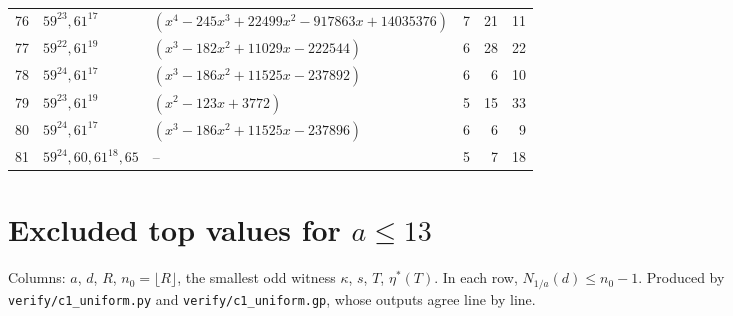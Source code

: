 \documentclass[11pt]{article}
\theoremstyle{definition}
\begin{document}
{\begin{longtable}{rlp{6.2cm}rrr}
76 & $59^{23}, 61^{17}$ & $(x^{4} - 245x^{3} + 22499x^{2} - 917863x + 14035376)$ & 7 & 21 & 11 \\
77 & $59^{22}, 61^{19}$ & $(x^{3} - 182x^{2} + 11029x - 222544)$ & 6 & 28 & 22 \\
78 & $59^{24}, 61^{17}$ & $(x^{3} - 186x^{2} + 11525x - 237892)$ & 6 & 6 & 10 \\
79 & $59^{23}, 61^{19}$ & $(x^{2} - 123x + 3772)$ & 5 & 15 & 33 \\
80 & $59^{24}, 61^{17}$ & $(x^{3} - 186x^{2} + 11525x - 237896)$ & 6 & 6 & 9 \\
81 & $59^{24}, 60, 61^{18}, 65$ & -- & 5 & 7 & 18 \\
\end{longtable}
}

\section{\texorpdfstring{Excluded top values for $a\le13$}{Excluded top values for a <= 13}}\label{app:U}
Columns: $a$, $d$, $R$, $n_0=\lfloor R\rfloor$, the smallest odd witness $\kappa$, $s$, $T$, $\eta^*(T)$. In
each row, $N_{1/a}(d)\le n_0-1$. Produced by \texttt{verify/c1\_uniform.py} and
\texttt{verify/c1\_uniform.gp}, whose outputs agree line by line.
\end{document}
